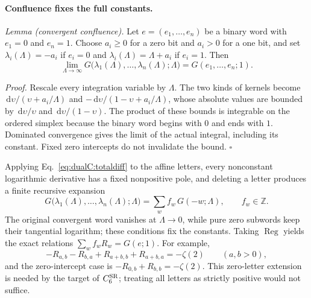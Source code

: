 \documentclass[11pt,a4paper]{article}
\numberwithin{equation}{section}
\newcommand{\dd}{\,\mathrm d}
\newcommand{\CSR}{C^{\rm SR}}
\begin{document}
\paragraph{Confluence fixes the full constants.} \emph{Lemma (convergent confluence).} Let $e=(e_1,\ldots,e_n)$ be a
binary word with $e_1=0$ and $e_n=1$. Choose $a_i\ge0$ for a zero bit and $a_i>0$ for a one bit, and set
$\lambda_i(\Lambda)=-a_i$ if $e_i=0$ and $\lambda_i(\Lambda)=\Lambda+a_i$ if $e_i=1$. Then
\begin{equation}
 \lim_{\Lambda\to\infty}G\bigl(\lambda_1(\Lambda),\ldots,\lambda_n(\Lambda);\Lambda\bigr)=G(e_1,\ldots,e_n;1).
 \label{eq:dualC:confluence}
\end{equation}

\emph{Proof.} Rescale every integration variable by $\Lambda$. The two kinds of kernels become
$\dd\upsilon/(\upsilon+a_i/\Lambda)$ and $-\dd\upsilon/(1-\upsilon+a_i/\Lambda)$, whose absolute values are bounded by
$\dd\upsilon/\upsilon$ and $\dd\upsilon/(1-\upsilon)$. The product of these bounds is integrable on the ordered simplex
because the binary word begins with $0$ and ends with $1$. Dominated convergence gives the limit of the actual
integral, including its constant. Fixed zero intercepts do not invalidate the bound. $\square$

Applying Eq.~\eqref{eq:dualC:totaldiff} to the affine letters, every nonconstant logarithmic derivative has a fixed
nonpositive pole, and deleting a letter produces a finite recursive expansion
\begin{equation}
 G\bigl(\lambda_1(\Lambda),\ldots,\lambda_n(\Lambda);\Lambda\bigr)=\sum_wf_w\,G(-w;\Lambda),\qquad f_w\in\mathbb Z.
\end{equation}
The original convergent word vanishes at $\Lambda\to0$, while pure zero subwords keep their tangential logarithm; these
conditions fix the constants. Taking $\operatorname{Reg}$ yields the exact relations $\sum_wf_wR_w=G(e;1)$. For example,
\begin{equation}
 -R_{a,b}-R_{b,a}+R_{a+b,b}+R_{a+b,a}=-\zeta(2)\qquad(a,b>0),
\end{equation}
and the zero-intercept case is $-R_{0,b}+R_{b,b}=-\zeta(2)$. This zero-letter extension is needed by the target of
$\CSR_6$; treating all letters as strictly positive would not suffice.
\end{document}
